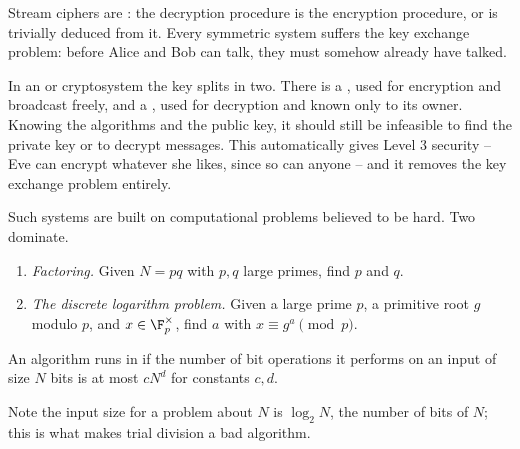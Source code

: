 Stream ciphers are : the decryption procedure is the encryption procedure, or is trivially deduced from it. Every symmetric system suffers the key exchange problem: before Alice and Bob can talk, they must somehow already have talked.

In an  or  cryptosystem the key splits in two. There is a , used for encryption and broadcast freely, and a , used for decryption and known only to its owner. Knowing the algorithms and the public key, it should still be infeasible to find the private key or to decrypt messages. This automatically gives Level 3 security -- Eve can encrypt whatever she likes, since so can anyone -- and it removes the key exchange problem entirely.

Such systems are built on computational problems believed to be hard. Two dominate.

\begin{enumerate}[label=(\roman*)]
	\item \emph{Factoring.} Given $N = pq$ with $p,q$ large primes, find $p$ and $q$.
	\item \emph{The discrete logarithm problem.} Given a large prime $p$, a primitive root $g$ modulo $p$, and $x \in \F_p^\times$, find $a$ with $x \equiv g^a \pmod p$.
\end{enumerate}

\begin{definition}
	An algorithm runs in  if the number of bit operations it performs on an input of size $N$ bits is at most $cN^d$ for constants $c,d$.
\end{definition}

Note the input size for a problem about $N$ is $\log_2 N$, the number of bits of $N$; this is what makes trial division a bad algorithm.

